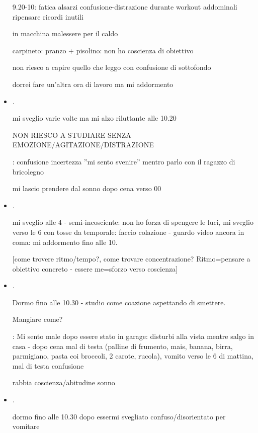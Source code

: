 \begin{itemize}
9.20-10: fatica alsarzi 
confusione-distrazione durante workout addominali
ripensare ricordi inutili

in macchina malessere per il caldo

carpineto: pranzo + pisolino: non ho coscienza di obiettivo

non riesco a capire quello che leggo con confusione di sottofondo

dorrei fare un'altra ora di lavoro ma mi addormento

\item {}.

mi sveglio varie volte ma mi alzo riluttante alle 10.20

NON RIESCO A STUDIARE SENZA EMOZIONE/AGITAZIONE/DISTRAZIONE

: confusione incertezza ''mi sento svenire'' mentro parlo con il ragazzo di bricolegno

mi lascio prendere dal sonno dopo cena verso 00

\item {}.

mi sveglio alle 4 - semi-incosciente: non ho forza di spengere le luci, mi sveglio verso le 6 con tosse da temporale: faccio colazione - guardo video ancora in coma: mi addormento fino alle 10.


[come trovere ritmo/tempo?, come trovare concentrazione? Ritmo=pensare a obiettivo concreto - essere me=sforzo verso coscienza]

\item {}.

Dormo fino alle 10.30 - studio come coazione aspettando di smettere.

Mangiare come?

: Mi sento male dopo essere stato in garage: disturbi alla vista mentre salgo in casa - dopo cena mal di testa (palline di frumento, mais, banana, birra, parmigiano, pasta coi broccoli, 2 carote, rucola), vomito verso le 6 di mattina, mal di testa confusione 

rabbia coscienza/abitudine sonno

\item {}.

dormo fino alle 10.30 dopo essermi svegliato confuso/disorientato per vomitare


\end{itemize}
